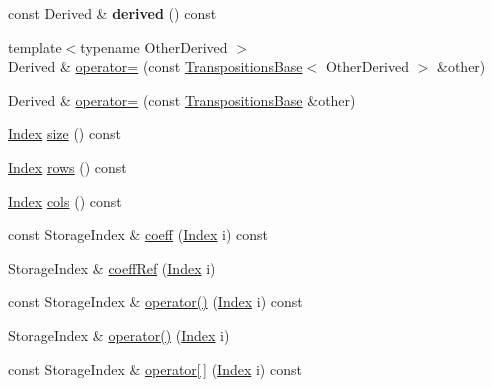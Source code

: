 \begin{DoxyCompactItemize}
\mbox{\label{class_eigen_1_1_transpositions_base_a170ba41d65a332d9e61f891ec6206ad9}} 
const Derived \& {\bfseries derived} () const
\item 
{\footnotesize template$<$typename Other\+Derived $>$ }\\Derived \& \hyperlink{class_eigen_1_1_transpositions_base_a476b5c653c6842e3e4d0104f7f888817}{operator=} (const \hyperlink{class_eigen_1_1_transpositions_base}{Transpositions\+Base}$<$ Other\+Derived $>$ \&other)
\item 
Derived \& \hyperlink{class_eigen_1_1_transpositions_base_a8d12862df7ffdb0f2cfd81ab122847ca}{operator=} (const \hyperlink{class_eigen_1_1_transpositions_base}{Transpositions\+Base} \&other)
\item 
\hyperlink{class_eigen_1_1_transpositions_base_a3f5f06118b419e8e6ccbe49ed5b4c91f}{Index} \hyperlink{class_eigen_1_1_transpositions_base_a6888d6261a9cc24ee8607496e610a5a3}{size} () const
\item 
\hyperlink{class_eigen_1_1_transpositions_base_a3f5f06118b419e8e6ccbe49ed5b4c91f}{Index} \hyperlink{class_eigen_1_1_transpositions_base_a8c073f17542a8fc9ac581c17f6cdc8d3}{rows} () const
\item 
\hyperlink{class_eigen_1_1_transpositions_base_a3f5f06118b419e8e6ccbe49ed5b4c91f}{Index} \hyperlink{class_eigen_1_1_transpositions_base_acb6f58081640839bd4102b75bdeec562}{cols} () const
\item 
const Storage\+Index \& \hyperlink{class_eigen_1_1_transpositions_base_aae1d3847b107e518c9f2b6010a6b635a}{coeff} (\hyperlink{class_eigen_1_1_transpositions_base_a3f5f06118b419e8e6ccbe49ed5b4c91f}{Index} i) const
\item 
Storage\+Index \& \hyperlink{class_eigen_1_1_transpositions_base_a97dda1bb4ff8bdd83d8e97af3e590252}{coeff\+Ref} (\hyperlink{class_eigen_1_1_transpositions_base_a3f5f06118b419e8e6ccbe49ed5b4c91f}{Index} i)
\item 
const Storage\+Index \& \hyperlink{class_eigen_1_1_transpositions_base_a150860addd2418f37da291f0ad9395f2}{operator()} (\hyperlink{class_eigen_1_1_transpositions_base_a3f5f06118b419e8e6ccbe49ed5b4c91f}{Index} i) const
\item 
Storage\+Index \& \hyperlink{class_eigen_1_1_transpositions_base_a8b3eb221d9ec1e51a161d276a0020e24}{operator()} (\hyperlink{class_eigen_1_1_transpositions_base_a3f5f06118b419e8e6ccbe49ed5b4c91f}{Index} i)
\item 
const Storage\+Index \& \hyperlink{class_eigen_1_1_transpositions_base_a689c79a6cdac938218de46638decb895}{operator\mbox{[}$\,$\mbox{]}} (\hyperlink{class_eigen_1_1_transpositions_base_a3f5f06118b419e8e6ccbe49ed5b4c91f}{Index} i) const

\end{DoxyCompactItemize}
